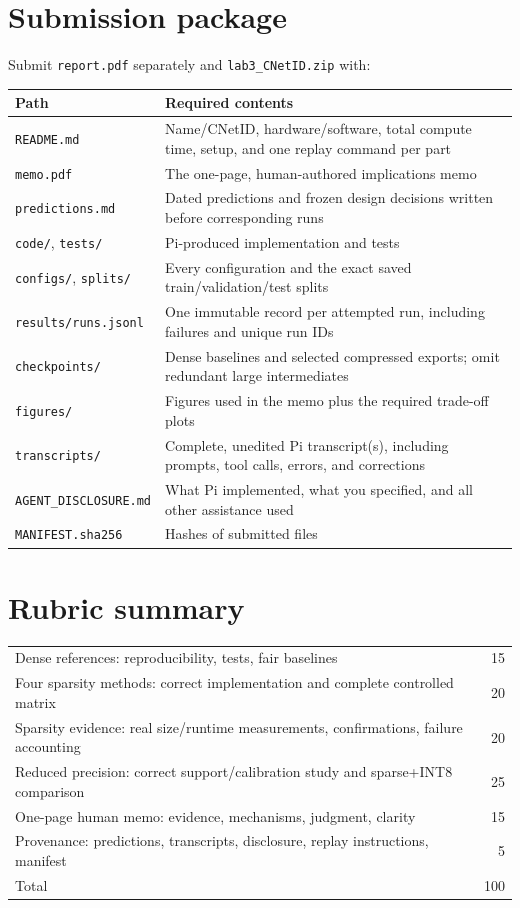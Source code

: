 \documentclass[11pt,letterpaper]{article}
\begin{document}
\section*{Submission package}
Submit \texttt{report.pdf} separately and \texttt{lab3\_CNetID.zip} with:
\begin{center}\small
\begin{tabularx}{\textwidth}{@{}p{}X@{}}\toprule
Path & Required contents \\\midrule
\texttt{README.md} & Name/CNetID, hardware/software, total compute time, setup, and one replay command per part \\
\texttt{memo.pdf} & The one-page, human-authored implications memo \\
\texttt{predictions.md} & Dated predictions and frozen design decisions written before corresponding runs \\
\texttt{code/}, \texttt{tests/} & Pi-produced implementation and tests \\
\texttt{configs/}, \texttt{splits/} & Every configuration and the exact saved train/validation/test splits \\
\texttt{results/runs.jsonl} & One immutable record per attempted run, including failures and unique run IDs \\
\texttt{checkpoints/} & Dense baselines and selected compressed exports; omit redundant large intermediates \\
\texttt{figures/} & Figures used in the memo plus the required trade-off plots \\
\texttt{transcripts/} & Complete, unedited Pi transcript(s), including prompts, tool calls, errors, and corrections \\
\texttt{AGENT\_DISCLOSURE.md} & What Pi implemented, what you specified, and all other assistance used \\
\texttt{MANIFEST.sha256} & Hashes of submitted files \\
\bottomrule\end{tabularx}
\end{center}

\section*{Rubric summary}
\begin{tabularx}{\textwidth}{@{}Xr@{}}\toprule
Dense references: reproducibility, tests, fair baselines & 15 \\
Four sparsity methods: correct implementation and complete controlled matrix & 20 \\
Sparsity evidence: real size/runtime measurements, confirmations, failure accounting & 20 \\
Reduced precision: correct support/calibration study and sparse+INT8 comparison & 25 \\
One-page human memo: evidence, mechanisms, judgment, clarity & 15 \\
Provenance: predictions, transcripts, disclosure, replay instructions, manifest & 5 \\\midrule
Total & 100 \\
\bottomrule\end{tabularx}
\end{document}
